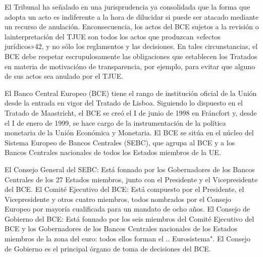\documentclass[10pt,a4paper]{article}
\begin{document}
El Tribunal ha señalado en una jurisprudencia ya consolidada que la forma que adopta un acto es indiferente a la hora de dilucidar si puede ser atacado mediante un recurso de anulación. Enconsecuencia, los actos del BCE sujetos a la revisión o lainterpretación del TJUE son todos los actos que produzcan «efectos jurídicos»42, y no sólo los reglamentos y las decisiones. En tales circunstancias, el BCE debe respetar escrupulosamente las obligaciones que establecen los Tratados en materia de motivacióno de transparencia, por ejemplo, para evitar que alguno de sus actos sea anulado por el TJUE.








El Banco Central Europeo (BCE) tiene el rango de institución oficial de la Unión desde la entrada en vigor del Tratado de Lisboa. Siguiendo lo dispuesto en el Tratado de Maastricht, el BCE se creó el I de junio de 1998 en Fráncfort y, desde el I de enero de 1999, se hace cargo de la instrumentación de la política monetaria de la Unión Económica y Monetaria. El BCE se sitúa en el núcleo del Sistema Europeo de Bancos Centrales (SEBC), que agrupa al BCE y a los Bancos Centrales nacionales de todos los Estados miembros de la UE.

El Consejo General del SEBC: Está fonnado por los Gobernadores de los Bancos Centrales de los 27 Estados miembros, junto con el Presidente y el Vicepresidente del BCE. El Comité Ejecutivo del BCE: Está compuesto por el Presidente, el Vicepresidente y otros cuatro miembros, todos nombrados por el Consejo Europeo por mayoría cualificada para un mandato de ocho años. El Consejo de Gobierno del BCE: Está fonnado por los seis miembros del Comité Ejecutivo del BCE y los Gobernadores de los Bancos Centrales nacionales de los Estados miembros de la zona del euro: todos ellos forman el .. Eurosistema". El Consejo de Gobierno es el principal órgano de toma de decisiones del BCE.
\end{document}
